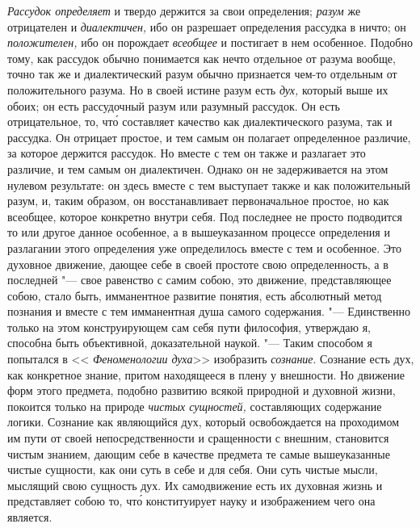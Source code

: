 {\em Рассудок определяет} и твердо держится за свои определения; {\em разум} же
отрицателен и {\em диалектичен,} ибо он разрешает определения рассудка в ничто;
он {\em положителен,} ибо он порождает {\em всеобщее} и постигает в нем
особенное. Подобно тому, как рассудок обычно понимается как нечто отдельное от
разума вообще, точно так же и диалектический разум обычно признается чем-то
отдельным от положительного разума. Но в своей истине разум есть {\em дух,}
который выше их обоих; он есть рассудочный разум или разумный рассудок. Он есть
отрицательное, то, чт\'{о} составляет качество как диалектического разума, так
и рассудка. Он отрицает простое, и тем самым он полагает определенное различие,
за которое держится рассудок. Но вместе с тем он также и разлагает это
различие, и тем самым он диалектичен. Однако он не задерживается на этом
нулевом результате: он здесь вместе с тем выступает также и как положительный
разум, и, таким образом, он восстанавливает первоначальное простое, но как
всеобщее, которое конкретно внутри себя. Под последнее не просто подводится то
или другое данное особенное, а в вышеуказанном процессе определения и
разлагании этого определения уже определилось вместе с тем и особенное. Это
духовное движение, дающее себе в своей простоте свою определенность, а в
последней "--- свое равенство с самим собою, это движение, представляющее
собою, стало быть, имманентное развитие понятия, есть абсолютный метод познания
и вместе с тем имманентная душа самого содержания. "--- Единственно только на
этом конструирующем сам себя пути философия, утверждаю я, способна быть
объективной, доказательной наукой. "--- Таким способом я попытался в <<{\em
Феноменологии духа}>> изобразить {\em сознание}. Сознание есть дух, как
конкретное знание, притом находящееся в плену у внешности. Но движение форм
этого предмета, подобно развитию всякой природной и духовной жизни, покоится
только на природе {\em чистых сущностей,} составляющих содержание логики.
Сознание как являющийся дух, который освобождается на проходимом им пути от
своей непосредственности и сращенности с внешним, становится чистым знанием,
дающим себе в качестве предмета те самые вышеуказанные чистые сущности, как они
суть в себе и для себя. Они суть чистые мысли, мыслящий свою сущность дух. Их
самодвижение есть их духовная жизнь и представляет собою то, чт\'{о}
конституирует науку и изображением чего она является.

